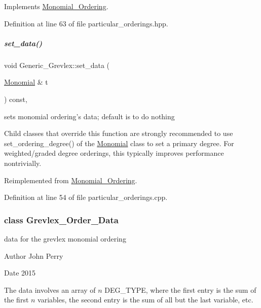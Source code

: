 Implements \hyperlink{group__orderinggroup_a9bc3155fc98b4d40c26118fa2114b827}{Monomial\+\_\+\+Ordering}.



Definition at line 63 of file particular\+\_\+orderings.\+hpp.

\mbox{\label{group__orderinggroup_a14c344858da03d16c8019afdae3da5dc}} 
\subparagraph{\texorpdfstring{set\+\_\+data()}{set\_data()}}
{\footnotesize\ttfamily void Generic\+\_\+\+Grevlex\+::set\+\_\+data (\begin{DoxyParamCaption}\item[{\hyperlink{group__polygroup_class_monomial}{Monomial} \&}]{t }\end{DoxyParamCaption}) const\hspace{0.3cm}{\ttfamily [override]}, {\ttfamily [virtual]}}



sets monomial ordering's data; default is to do nothing 

Child classes that override this function are strongly recommended to use set\+\_\+ordering\+\_\+degree() of the \hyperlink{group__polygroup_class_monomial}{Monomial} class to set a primary degree. For weighted/graded degree orderings, this typically improves performance nontrivially. 

Reimplemented from \hyperlink{group__orderinggroup_a22b08dffd1cdf3a655ca18d604cfcee1}{Monomial\+\_\+\+Ordering}.



Definition at line 54 of file particular\+\_\+orderings.\+cpp.

\label{class_grevlex___order___data}
\subsubsection{class Grevlex\+\_\+\+Order\+\_\+\+Data}
data for the grevlex monomial ordering 

\begin{DoxyAuthor}{Author}
John Perry 
\end{DoxyAuthor}
\begin{DoxyDate}{Date}
2015
\end{DoxyDate}
The data involves an array of $n$ {\ttfamily D\+E\+G\+\_\+\+T\+Y\+PE}, where the first entry is the sum of the first $n$ variables, the second entry is the sum of all but the last variable, etc. 

